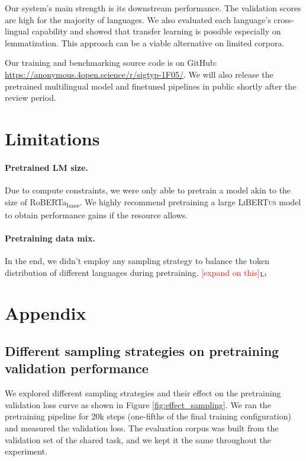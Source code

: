 \documentclass[11pt]{article}
\newcommand{\draftonly}[1]{#1}
\newcommand{\draftcomment}[3]{\draftonly{\textcolor{#2}{[#3]{$_{\textsc{#1}}$}}}}
\newcommand{\lj}[1]{\draftcomment{Lj}{red}{#1}}
\newcommand{\libertus}{\textsc{LiBERTus}}
\newcommand{\githuburl}{\url{https://anonymous.4open.science/r/sigtyp-1F05/}}
\begin{document}
Our system's main strength is its downstream performance.
The validation scores are high for the majority of languages.
We also evaluated each language's cross-lingual capability and showed that transfer learning is possible especially on lemmatization.
This approach can be a viable alternative on limited corpora.

Our training and benchmarking source code is on GitHub: \githuburl{}.
We will also release the pretrained multilingual model and finetuned pipelines in public shortly after the review period.


\section*{Limitations}

\paragraph{Pretrained LM size.}
Due to compute constraints, we were only able to pretrain a model akin to the size of RoBERTa\textsubscript{base}.
We highly recommend pretraining a large \libertus{} model to obtain performance gains if the resource allows.

\paragraph{Pretraining data mix.}
In the end, we didn't employ any sampling strategy to balance the token distribution of different languages during pretraining.
\lj{expand on this}




\appendix

\section{Appendix}
\label{sec:appendix}

\subsection{Different sampling strategies on pretraining validation performance}

We explored different sampling strategies and their effect on the pretraining validation loss curve as shown in Figure \ref{fig:effect_sampling}.
We ran the pretraining pipeline for 20k steps (one-fifths of the final training configuration) and measured the validation loss.
The evaluation corpus was built from the validation set of the shared task, and we kept it the same throughout the experiment.
\end{document}

